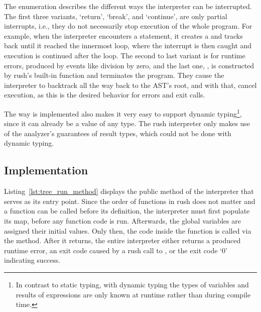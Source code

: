 The enumeration  describes the different ways the interpreter can be interrupted.
The first three variants, `return', `break', and `continue', are only partial interrupts, i.e., they do not necessarily stop execution of the whole program.
For example, when the interpreter encounters a  statement, it creates a  and tracks back until it reached the innermost loop, where the interrupt is then caught and execution is continued after the loop.
The second to last variant is for runtime errors, produced by events like division by zero, and the last one, , is constructed by rush's built-in  function and terminates the program.
They cause the interpreter to backtrack all the way back to the AST's root, and with that, cancel execution, as this is the desired behavior for errors and exit calls.

The way  is implemented also makes it very easy to support dynamic typing\footnote{In contrast to static typing, with dynamic typing the types of variables and results of expressions are only known at runtime rather than during compile time.}, since it can already be a value of any type.
The rush interpreter only makes use of the analyzer's guarantees of result types, which could not be done with dynamic typing.

\subsection{Implementation}


Listing~\ref{lst:tree_run_method} displays the public  method of the interpreter that serves as its entry point.
Since the order of functions in rush does not matter and a function can be called before its definition, the interpreter must first populate its  map, before any function code is run.
Afterwards, the global variables are assigned their initial values.
Only then, the code inside the  function is called via the  method.
After it returns, the entire interpreter either returns a produced runtime error, an exit code caused by a rush call to , or the exit code `0' indicating success.


